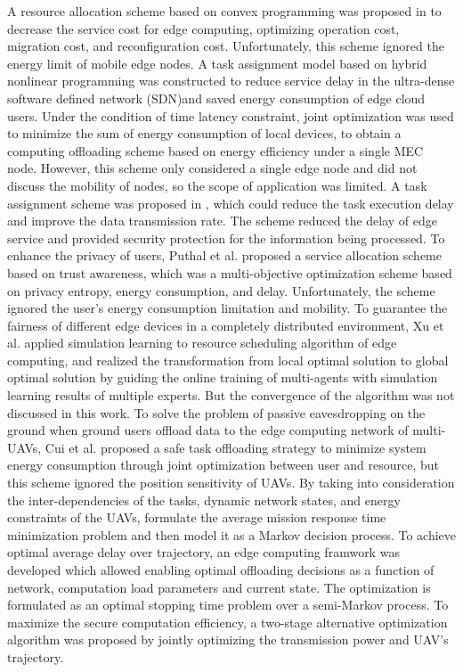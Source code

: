 \documentclass[journal,article,submit,pdftex,moreauthors]{Definitions/mdpi}
\begin{document}
A resource allocation scheme based on convex programming was proposed in \cite{WANG} to decrease the service cost for edge computing, optimizing operation cost, migration cost, and reconfiguration cost. Unfortunately, this scheme ignored the energy limit of mobile edge nodes. A task assignment model based on hybrid nonlinear programming \cite{HABER} was constructed  to reduce service delay in the ultra-dense software defined network (SDN)and saved energy consumption of edge cloud users. Under the condition of time latency constraint, joint optimization was used to minimize the sum of energy consumption of local devices, to obtain a computing offloading scheme based on energy efficiency under a single MEC node. However, this scheme only considered a single edge node and did not discuss the mobility of nodes, so the scope of application was limited. A  task assignment scheme was proposed in \cite{CHEN M}, which could reduce the task execution delay and improve the data transmission rate. The scheme reduced the delay of edge service and provided security protection for the information being processed. To enhance the privacy of users, Puthal et al. \cite{PUTHAL} proposed a service allocation scheme based on trust awareness, which was a multi-objective optimization scheme based on privacy entropy, energy consumption, and delay. Unfortunately, the scheme ignored the user's energy consumption limitation and mobility. To guarantee the fairness of different edge devices in a completely distributed environment, Xu et al. \cite{XU X L} applied simulation learning to resource scheduling algorithm of edge computing, and realized the transformation from local optimal solution to global optimal solution by guiding the online training of multi-agents with simulation learning results of multiple experts. But the convergence of the algorithm was not discussed in this work. To solve the problem of passive eavesdropping on the ground when ground users offload data to the edge computing network of multi-UAVs, Cui et al. \cite{CUI G F} proposed a safe task offloading strategy to minimize system energy consumption through joint optimization between user and resource, but this scheme ignored the position sensitivity of UAVs. By taking into consideration the inter-dependencies of the tasks, dynamic network states, and energy constraints of the UAVs, \cite{Zhusc20} formulate the average mission response time minimization problem and then model it as a Markov decision process. To achieve optimal average delay over trajectory, an edge computing framwork \cite{Callegaro2021} was developed which allowed enabling optimal offloading decisions as a function of network, computation load parameters and current state. The optimization is formulated as an optimal stopping time problem over a semi-Markov process. To maximize the secure computation efficiency, a two-stage alternative optimization algorithm \cite{Amos2021} was  proposed  by jointly optimizing the transmission power and UAV's trajectory. 
\end{document}
